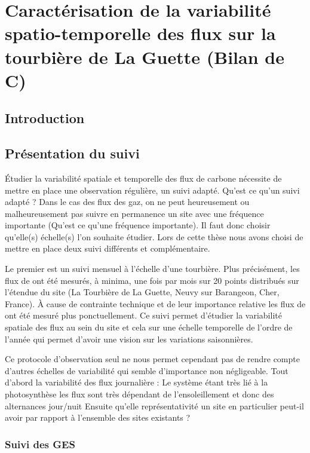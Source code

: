 \chapter{Caractérisation de la variabilité spatio-temporelle des flux sur la tourbière de La Guette (Bilan de C)}
\newpage

\section{Introduction}
\section{Présentation du suivi}
Étudier la variabilité spatiale et temporelle des flux de carbone nécessite de mettre en place une observation régulière, un suivi adapté.
Qu'est ce qu'un suivi adapté ? Dans le cas des flux des gaz, on ne peut heureusement ou malheureusement pas suivre en permanence un site avec une fréquence importante (Qu'est ce qu'une fréquence importante).
Il faut donc choisir qu'elle(s) échelle(s) l'on souhaite étudier.
Lors de cette thèse nous avons choisi de mettre en place deux suivi différents et complémentaire.

Le premier est un suivi mensuel à l'échelle d'une tourbière. 
Plus précisément, les flux de \COO ont été mesurés, à minima, une fois par mois sur 20 points distribués sur l'étendue du site (La Tourbière de La Guette, Neuvy sur Barangeon, Cher, France).
À cause de contrainte technique et de leur importance relative  les flux de \CHH ont été mesuré plus ponctuellement.
Ce suivi permet d'étudier la variabilité spatiale des flux au sein du site et cela sur une échelle temporelle de l'ordre de l'année qui permet d'avoir une vision sur les variations saisonnières.

Ce protocole d'observation seul ne nous permet cependant pas de rendre compte d'autres échelles de variabilité qui semble d'importance non négligeable. 
Tout d'abord la variabilité des flux journalière : 
Le système étant très lié à la photosynthèse les flux sont très dépendant de l’ensoleillement et donc des alternances jour/nuit
Ensuite qu'elle représentativité un site en particulier peut-il avoir par rapport à l'ensemble des sites existants ?

\subsection{Suivi des GES}
